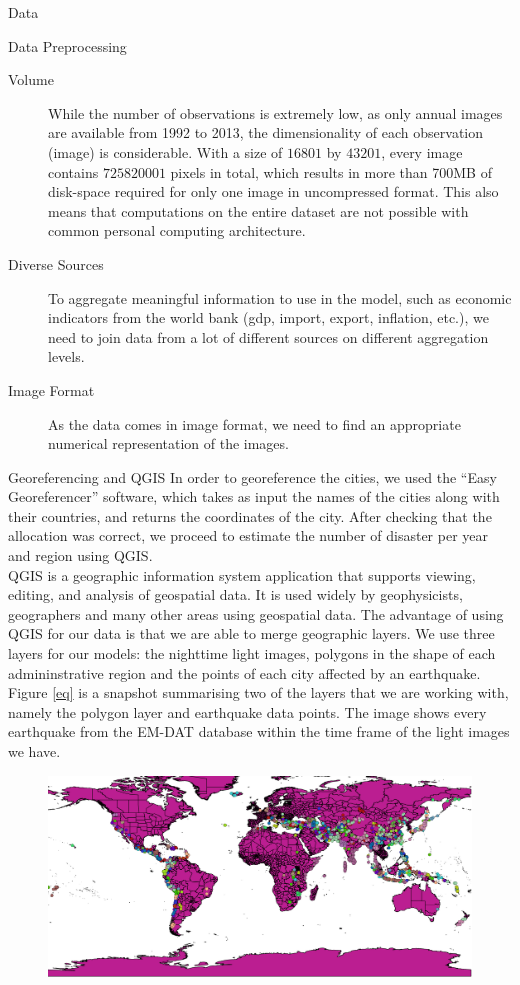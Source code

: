 \documentclass[12.5pt,fleqn,leqno,letterpaper]{article}
\begin{document}
\begin{section}{Data}
  \begin{subsection}{Data Preprocessing}
    \begin{description}
      \item[Volume]{While the number of observations is extremely low, as only annual images are available from 1992 to 2013, the dimensionality of each observation (image) is considerable. With a size of $16801$ by $43201$, every image contains $725820001$ pixels in total, which results in more than 700MB of disk-space required for only one image in uncompressed format. This also means that computations on the entire dataset are not possible with common personal computing architecture.}
      \item[Diverse Sources]{To aggregate meaningful information to use in the model, such as economic indicators from the world bank (gdp, import, export, inflation, etc.), we need to join data from a lot of different sources on different aggregation levels.}
      \item[Image Format]{As the data comes in image format, we need to find an appropriate numerical representation of the images.}
    \end{description}
    \begin{subsubsection}{Georeferencing and QGIS}
      In order to georeference the cities, we used the ``Easy Georeferencer'' software, which takes as input the names of the cities along with their countries, and returns the coordinates of the city. After checking that the allocation was correct, we proceed to estimate the number of disaster per year and region using QGIS. \\
      QGIS is a geographic information system application that supports viewing, editing, and analysis of geospatial data. It is used widely by geophysicists, geographers and many other areas using geospatial data. The advantage of using QGIS for our data is that we are able to merge geographic layers. We use three layers for our models: the nighttime light images, polygons in the shape of each admininstrative region and the points of each city affected by an earthquake. Figure \ref{eq} is a snapshot summarising two of the layers that we are working with, namely the polygon layer and earthquake data points. The image shows every earthquake from the EM-DAT database within the time frame of the light images we have.
      \begin{figure}[htbp]
        \centering
        \includegraphics[width=1\linewidth]{world_regions}

\end{figure}
\end{subsubsection}
\end{subsection}
\end{section}
\end{document}
